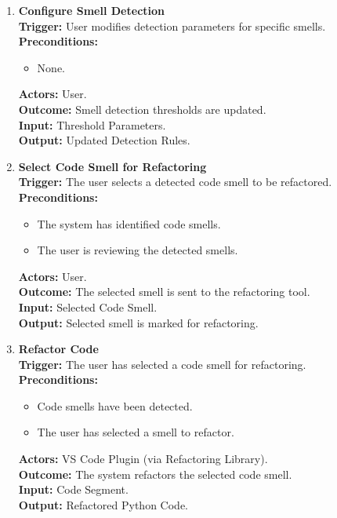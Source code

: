 \documentclass[12pt]{article}
\begin{document}
\begin{enumerate}[label={\bf PUC \arabic*:}, wide=0pt, font=\itshape]
  \item \textbf{Configure Smell Detection} \\[2mm]
    \textbf{Trigger:} User modifies detection parameters for specific smells. \\[2mm]
    \textbf{Preconditions:}
    \begin{itemize}
      \item None.
    \end{itemize}
    \textbf{Actors:} User. \\
    \textbf{Outcome:} Smell detection thresholds are updated. \\
    \textbf{Input:} Threshold Parameters. \\
    \textbf{Output:} Updated Detection Rules.

  \item \textbf{Select Code Smell for Refactoring} \\[2mm]
    \textbf{Trigger:} The user selects a detected code smell to be refactored. \\[2mm]
    \textbf{Preconditions:}
    \begin{itemize}
      \item The system has identified code smells.
      \item The user is reviewing the detected smells.
    \end{itemize}
    \textbf{Actors:} User. \\
    \textbf{Outcome:} The selected smell is sent to the refactoring tool. \\
    \textbf{Input:} Selected Code Smell. \\
    \textbf{Output:} Selected smell is marked for refactoring.

  \item \textbf{Refactor Code} \\[2mm]
    \textbf{Trigger:} The user has selected a code smell for refactoring. \\[2mm]
    \textbf{Preconditions:}
    \begin{itemize}
      \item Code smells have been detected.
      \item The user has selected a smell to refactor.
    \end{itemize}
    \textbf{Actors:} VS Code Plugin (via Refactoring Library). \\
    \textbf{Outcome:} The system refactors the selected code smell. \\
    \textbf{Input:} Code Segment. \\
    \textbf{Output:} Refactored Python Code.


\end{enumerate}
\end{document}
